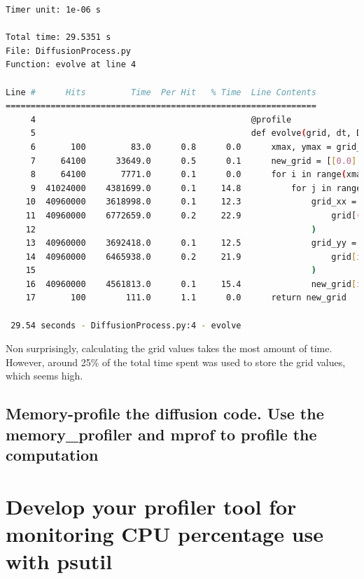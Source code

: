 \documentclass[a4paper,12pt]{article}
\begin{document}
\begin{lstlisting}[language=bash,basicstyle=\tiny\ttfamily]
Timer unit: 1e-06 s

Total time: 29.5351 s
File: DiffusionProcess.py
Function: evolve at line 4

Line #      Hits         Time  Per Hit   % Time  Line Contents
==============================================================
     4                                           @profile
     5                                           def evolve(grid, dt, D=1.0):
     6       100         83.0      0.8      0.0      xmax, ymax = grid_shape
     7     64100      33649.0      0.5      0.1      new_grid = [[0.0] * ymax for x in range(xmax)]
     8     64100       7771.0      0.1      0.0      for i in range(xmax):
     9  41024000    4381699.0      0.1     14.8          for j in range(ymax):
    10  40960000    3618998.0      0.1     12.3              grid_xx = (
    11  40960000    6772659.0      0.2     22.9                  grid[(i + 1) % xmax][j] + grid[(i - 1) % xmax][j] - 2.0 * grid[i][j]
    12                                                       )
    13  40960000    3692418.0      0.1     12.5              grid_yy = (
    14  40960000    6465938.0      0.2     21.9                  grid[i][(j + 1) % ymax] + grid[i][(j - 1) % ymax] - 2.0 * grid[i][j]
    15                                                       )
    16  40960000    4561813.0      0.1     15.4              new_grid[i][j] = grid[i][j] + D * (grid_xx + grid_yy) * dt
    17       100        111.0      1.1      0.0      return new_grid

 29.54 seconds - DiffusionProcess.py:4 - evolve
\end{lstlisting}

Non surprisingly, calculating the grid values takes the most amount of time.
However, around 25\% of the total time spent was used to store the grid values, which seems high.

\subsection{Memory-profile the diffusion code. Use the memory\_profiler and mprof to profile the computation}

\newpage
\section{Develop your profiler tool for monitoring CPU percentage use with psutil}


\end{document}
